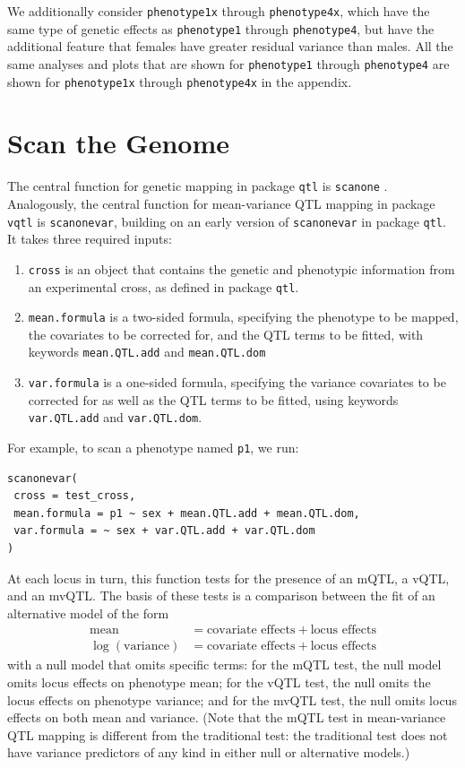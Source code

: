 \documentclass[9pt,twocolumn,twoside]{gsag3jnl}
\begin{document}
We additionally consider \texttt{phenotype1x} through \texttt{phenotype4x}, which have the same type of genetic effects as \texttt{phenotype1} through \texttt{phenotype4}, but have the additional feature that females have greater residual variance than males.
All the same analyses and plots that are shown for \texttt{phenotype1} through \texttt{phenotype4} are shown for \texttt{phenotype1x} through \texttt{phenotype4x} in the appendix.

\section*{Scan the Genome}

The central function for genetic mapping in package \texttt{qtl} is \texttt{scanone} \citep{Broman2003}.
Analogously, the central function for mean-variance QTL mapping in package \texttt{vqtl} is \texttt{scanonevar}, building on an early version of \texttt{scanonevar} in package \texttt{qtl}.
It takes three required inputs:
\begin{enumerate}
    \item \texttt{cross} is an object that contains the genetic and phenotypic information from an experimental cross, as defined in package \texttt{qtl}.
    \item \texttt{mean.formula} is a two-sided formula, specifying the phenotype to be mapped, the covariates to be corrected for, and the QTL terms to be fitted, with keywords \texttt{mean.QTL.add} and \texttt{mean.QTL.dom}
    \item \texttt{var.formula} is a one-sided formula, specifying the variance covariates to be corrected for as well as the QTL terms to be fitted, using keywords \texttt{var.QTL.add} and \texttt{var.QTL.dom}.
\end{enumerate}
For example, to scan a phenotype named \texttt{p1}, we run:
\begin{verbatim}
scanonevar(
 cross = test_cross,
 mean.formula = p1 ~ sex + mean.QTL.add + mean.QTL.dom,
 var.formula = ~ sex + var.QTL.add + var.QTL.dom
)
\end{verbatim}
At each locus in turn, this function tests for the presence of an mQTL, a vQTL, and an mvQTL. The basis of these tests is a comparison between the fit of an alternative model of the form
\begin{align*}
    \text{mean} &= \text{covariate effects} + \text{locus effects}\\
    \log(\text{variance}) &= \text{covariate effects} + \text{locus effects}    
\end{align*}
with a null model that omits specific terms: for the mQTL test, the null model omits locus effects on phenotype mean; for the vQTL test, the null omits the locus effects on phenotype variance; and for the mvQTL test, the null omits locus effects on both mean and variance.
(Note that the mQTL test in mean-variance QTL mapping is different from the traditional test: the traditional test does not have variance predictors of any kind in either null or alternative models.)
\end{document}
